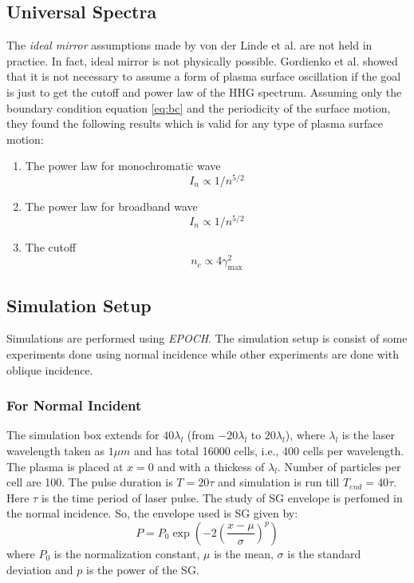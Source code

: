 \documentclass[12pt]{article}
\begin{document}
\subsection{Universal Spectra}
The \textit{ideal mirror} assumptions made by von der Linde et al.\cite{hhg-main} are not held in practice. In fact, ideal mirror is not physically possible. Gordienko et al.\cite{universal-spectra} showed that it is not necessary to assume a form of plasma surface oscillation if the goal is just to get the cutoff and power law of the HHG spectrum. Assuming only the boundary condition equation \ref{eq:bc} and the periodicity of the surface motion, they found the following results which is valid for any type of plasma surface motion:
\begin{enumerate}
    \item The power law for monochromatic wave
          \begin{equation}
              \label{eq:power-law-u}
              I_n \propto 1/n^{5/2}
          \end{equation}
    \item The power law for broadband wave
          \begin{equation*}
              I_n \propto 1/n^{5/2}
          \end{equation*}
    \item The cutoff
          \begin{equation}
              \label{eq:cutoff-u}
              n_c \propto 4\gamma_{\max}^2
          \end{equation}
\end{enumerate}

\subsection{Simulation Setup}
Simulations are performed using \textit{EPOCH}\cite{EPOCH}. The simulation setup is consist of some experiments done using normal incidence while other experiments are done with oblique incidence.
\subsubsection{For Normal Incident}
The simulation box extends for $40 \lambda _l$ (from $-20 \lambda _l$ to $20 \lambda _l$), where $\lambda_l$ is the laser wavelength taken as $1\mu m$ and has total 16000 cells, i.e., 400 cells per wavelength. The plasma is placed at $x=0$ and with a thickess of $\lambda_l$. Number of particles per cell are 100. The pulse duration is $T = 20 \tau$ and simulation is run till $T_{end} = 40 \tau$. Here $\tau$ is the time period of laser pulse. The study of SG envelope is perfomed in the normal incidence. So, the envelope used is SG given by:
\begin{equation}
    \label{eq:sg}
    P = P_0 \exp\left( -2 \left(\frac{x - \mu}{\sigma}\right)^p\right)
\end{equation}
where $P_0$ is the normalization constant, $\mu$ is the mean, $\sigma$ is the standard deviation and $p$ is the power of the SG.
\end{document}
